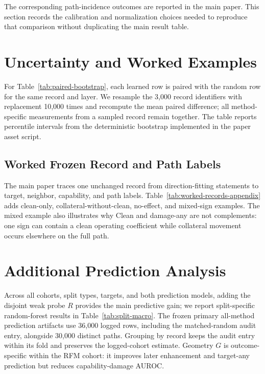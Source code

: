 The corresponding path-incidence outcomes are reported in the main paper. This
section records the calibration and normalization choices needed to reproduce
that comparison without duplicating the main result table.

\section{Uncertainty and Worked Examples}

For Table~\ref{tab:paired-bootstrap}, each learned row is paired with the random
row for the same record and layer. We resample the 3,000 record identifiers with
replacement 10,000 times and recompute the mean paired difference; all
method-specific measurements from a sampled record remain together. The table
reports percentile intervals from the deterministic bootstrap implemented in
the paper asset script.



\subsection{Worked Frozen Record and Path Labels}

The main paper traces one unchanged record from direction-fitting statements to
target, neighbor, capability, and path labels. Table~\ref{tab:worked-records-appendix}
adds clean-only, collateral-without-clean, no-effect, and mixed-sign examples.
The mixed example also illustrates why Clean and damage-any are not
complements: one sign can contain a clean operating coefficient while
collateral movement occurs elsewhere on the full path.



\section{Additional Prediction Analysis}

Across all cohorts, split types, targets, and both prediction models, adding
the disjoint weak probe $R$ provides the main predictive gain; we report
split-specific random-forest results in Table~\ref{tab:split-macro}.
The frozen primary all-method prediction artifacts use 36,000 logged rows,
including the matched-random audit entry, alongside 30,000 distinct paths.
Grouping by record keeps the audit entry within its fold and preserves the
logged-cohort estimate. Geometry $G$ is outcome-specific within the RFM cohort:
it improves later enhancement and target-any prediction but reduces
capability-damage AUROC.

